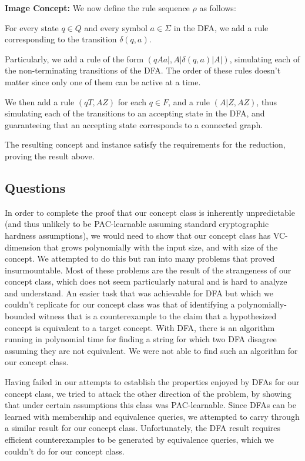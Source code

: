 \documentclass[]{article}
\begin{document}
\textbf{Image Concept:}
We now define the rule sequence $\rho$ as follows:

For every state $q\in Q$ and every symbol $a\in \Sigma$ in the DFA, we add a rule corresponding to the transition $\delta(q,a)$.

Particularly, we add a rule of the form $(qAa|, A|\delta(q,a)|A|)$, simulating
each of the non-terminating transitions of the DFA. The order of
these rules doesn't matter since only one of them can be active at a time.

We then add a rule $(qT, AZ)$ for each $q\in F$, and a rule $(A|Z,AZ)$, thus
simulating each of the transitions to an accepting state in the DFA, and
guaranteeing that an accepting state corresponds to a connected graph.

The resulting concept and instance satisfy the requirements for the reduction,
proving the result above.

\subsection{Questions}

In order to complete the proof that our concept class is inherently
unpredictable (and thus unlikely to be PAC-learnable assuming standard
cryptographic hardness assumptions), we would need to show that our concept
class has VC-dimension that grows polynomially with the input size, and with
size of the concept. We attempted to do this but ran into many problems that
proved insurmountable. Most of these problems are the result of the strangeness
of our concept class, which does not seem particularly natural and is hard to
analyze and understand. An easier task that was achievable for DFA but which we
couldn't replicate for our concept class was that of identifying a
polynomially-bounded witness that is a counterexample to the claim that a
hypothesized concept is equivalent to a target concept. With DFA, there is an
algorithm running in polynomial time for finding a string for which two DFA
disagree assuming they are not equivalent. We were not able to find such an
algorithm for our concept class.

Having failed in our attempts to establish the properties enjoyed by DFAs for
our concept class, we tried to attack the other direction of the problem, by
showing that under certain assumptions this class was PAC-learnable. Since DFAs
can be learned with membership and equivalence queries, we attempted to carry
through a similar result for our concept class. Unfortunately, the DFA result
requires efficient counterexamples to be generated by equivalence queries, which
we couldn't do for our concept class.
\end{document}
